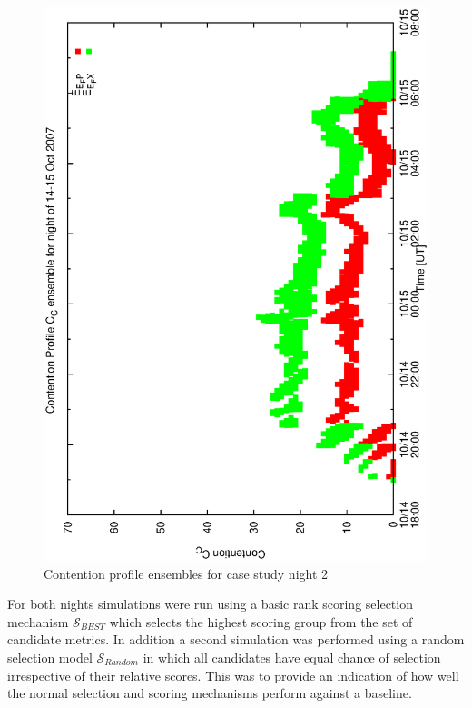 \documentclass[12pt,a4paper]{article}
\begin{document}
{\begin{figure}[h]
 \begin{center}
    \includegraphics[scale=0.5, angle=-90]{figures/cont6_ensemble.eps}
    \caption{Contention profile ensembles for case study night 2} 
  \label{fig:cont6_ensemble}
 \end{center}
\end{figure}


For both nights simulations were run using a basic rank scoring selection mechanism $\mathcal{S}_{BEST}$ which selects the highest scoring group from the set of candidate metrics. In addition a second simulation was performed using a random selection model $\mathcal{S}_{Random}$ in which all candidates have equal chance of selection irrespective of their relative scores. This was to provide an indication of how well the normal selection and scoring mechanisms perform against a baseline.

}
\end{document}
